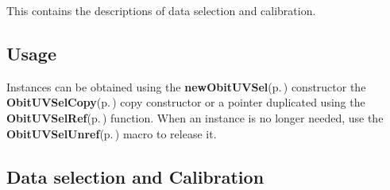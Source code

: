 This contains the descriptions of data selection and calibration.\subsection{Usage}\label{ObitUVSel_8h_ObitUVSelUsage}
Instances can be obtained using the {\bf new\-Obit\-UVSel}{\rm (p.\,\pageref{ObitUVSel_8c_a7})} constructor the {\bf Obit\-UVSel\-Copy}{\rm (p.\,\pageref{ObitUVSel_8c_a9})} copy constructor or a pointer duplicated using the {\bf Obit\-UVSel\-Ref}{\rm (p.\,\pageref{ObitUVSel_8h_a1})} function. When an instance is no longer needed, use the {\bf Obit\-UVSel\-Unref}{\rm (p.\,\pageref{ObitUVSel_8h_a0})} macro to release it.\subsection{Data selection and Calibration}\label{ObitUVSel_8h_ObitUVSelCalibration}
